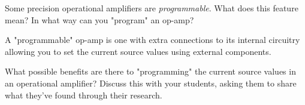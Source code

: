 

Some precision operational amplifiers are {\it programmable}.  What does this feature mean?  In what way can you "program" an op-amp?







A "programmable" op-amp is one with extra connections to its internal circuitry allowing you to set the current source values using external components.







What possible benefits are there to "programming" the current source values in an operational amplifier?  Discuss this with your students, asking them to share what they've found through their research.





